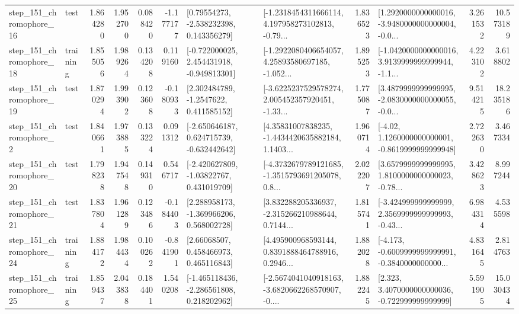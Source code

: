 \begin{tabular}{llrrrrllrlrr}
  step\_151\_chromophore\_16 &      test &      1.864280 &    1.952700 &      0.088420 & -1.177177 &     [0.79554273, -2.538232398, 0.143356279] &  [-1.2318454311666114, 4.197958273102813, -0.79... &       1.836523 &  [1.2920000000000016, -3.9480000000000004, -0.0... &            3.261532 &         10.573189 \\
  step\_151\_chromophore\_18 &  training &      1.855056 &    1.989264 &      0.134208 &  0.119160 &   [-0.722000025, 2.454431918, -0.949813301] &  [-1.2922080406654057, 4.25893580697185, -1.052... &       1.895253 &  [-1.0420000000000016, 3.9139999999999944, -1.1... &            4.223102 &          3.618802 \\
  step\_151\_chromophore\_19 &      test &      1.870294 &    1.993902 &      0.123608 & -0.180933 &      [2.302484789, -1.2547622, 0.411585152] &  [-3.6225237529578274, 2.005452357920451, -1.33... &       1.775087 &  [3.4879999999999995, -2.0830000000000055, -0.0... &            9.514215 &         18.235186 \\
   step\_151\_chromophore\_2 &      test &      1.840661 &    1.973885 &      0.133224 &  0.091312 &   [-2.650646187, 0.624715739, -0.632442642] &  [4.35831007838235, -1.4434420635882184, 1.1403... &       1.960714 &   [-4.02, 1.1260000000000001, -0.8619999999999948] &            2.722630 &          3.467334 \\
  step\_151\_chromophore\_20 &      test &      1.798238 &    1.947548 &      0.149310 &  0.546717 &    [-2.420627809, -1.03822767, 0.431019709] &  [-4.3732679789121685, -1.3515793691205078, 0.8... &       2.022207 &  [3.6579999999999995, 1.8100000000000023, -0.78... &            3.428623 &          8.997244 \\
  step\_151\_chromophore\_21 &      test &      1.837804 &    1.961289 &      0.123486 & -0.184403 &    [2.288958173, -1.369966206, 0.568002728] &  [3.832288205336937, -2.315266210988644, 0.7144... &       1.815741 &  [-3.424999999999999, 2.3569999999999993, -0.43... &            6.984314 &          4.535598 \\
  step\_151\_chromophore\_24 &  training &      1.884172 &    1.984434 &      0.100262 & -0.841901 &      [2.66068507, 0.458466973, 0.465116843] &  [4.495900968593144, 0.8391888464788916, 0.2946... &       1.882028 &  [-4.173, -0.6009999999999991, -0.3840000000000... &            4.831645 &          2.814763 \\
  step\_151\_chromophore\_25 &  training &      1.859437 &    2.043838 &      0.184401 &  1.540208 &   [-1.465118436, -2.286561808, 0.218202962] &  [-2.5674041040918163, -3.6820662268570907, -0.... &       1.882245 &    [2.323, 3.4070000000000036, -0.722999999999999] &            5.591905 &         15.030434 \\

\end{tabular}

